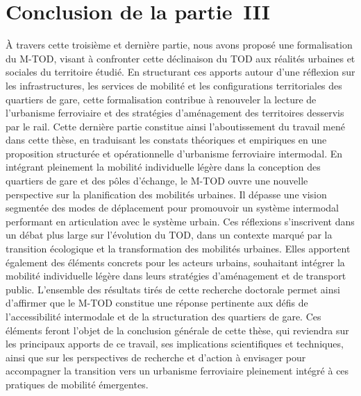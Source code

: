 
\cleardoublepage
\section*{Conclusion de la partie~III
    \label{part3:conclusion}
    }

\lettrine[lines=3, findent=8pt, nindent=0pt]{ À}{} travers cette troisième et dernière partie, nous avons proposé une formalisation du \acrshort{M-TOD}, visant à confronter cette déclinaison du \acrshort{TOD} aux réalités urbaines et sociales du territoire étudié. En structurant ces apports autour d’une réflexion sur les infrastructures, les services de mobilité et les configurations territoriales des quartiers de gare, cette formalisation contribue à renouveler la lecture de l’urbanisme ferroviaire et des stratégies d’aménagement des territoires desservis par le rail. Cette dernière partie constitue ainsi l’aboutissement du travail mené dans cette thèse, en traduisant les constats théoriques et empiriques en une proposition structurée et opérationnelle d’urbanisme ferroviaire intermodal. En intégrant pleinement la mobilité individuelle légère dans la conception des quartiers de gare et des pôles d’échange, le \acrshort{M-TOD} ouvre une nouvelle perspective sur la planification des mobilités urbaines. Il dépasse une vision segmentée des modes de déplacement pour promouvoir un système intermodal performant en articulation avec le système urbain. Ces réflexions s’inscrivent dans un débat plus large sur l’évolution du \acrshort{TOD}, dans un contexte marqué par la transition écologique et la transformation des mobilités urbaines. Elles apportent également des éléments concrets pour les acteurs urbains, souhaitant intégrer la mobilité individuelle légère dans leurs stratégies d’aménagement et de transport public. L’ensemble des résultats tirés de cette recherche doctorale permet ainsi d’affirmer que le \acrshort{M-TOD} constitue une réponse pertinente aux défis de l’accessibilité intermodale et de la structuration des quartiers de gare. Ces éléments feront l’objet de la conclusion générale de cette thèse, qui reviendra sur les principaux apports de ce travail, ses implications scientifiques et techniques, ainsi que sur les perspectives de recherche et d’action à envisager pour accompagner la transition vers un urbanisme ferroviaire pleinement intégré à ces pratiques de mobilité émergentes.%